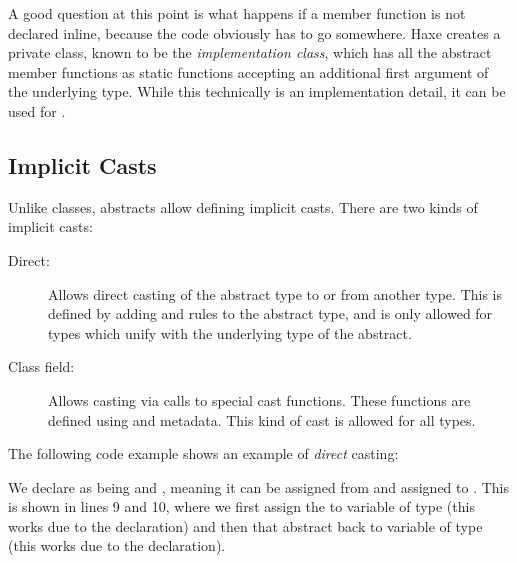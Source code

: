 A good question at this point is what happens if a member function is not declared inline, because the code obviously has to go somewhere. Haxe creates a private class, known to be the \emph{implementation class}, which has all the abstract member functions as static functions accepting an additional first argument  of the underlying type. While this technically is an implementation detail, it can be used for .







\subsection{Implicit Casts}
\label{types-abstract-implicit-casts}

Unlike classes, abstracts allow defining implicit casts. There are two kinds of implicit casts:

\begin{description}
	\item[Direct:] Allows direct casting of the abstract type to or from another type. This is defined by adding  and  rules to the abstract type, and is only allowed for types which unify with the underlying type of the abstract.
	\item[Class field:] Allows casting via calls to special cast functions. These functions are defined using  and  metadata. This kind of cast is allowed for all types.
\end{description}
The following code example shows an example of \emph{direct} casting:

We declare  as being  and , meaning it can be assigned from  and assigned to . This is shown in lines 9 and 10, where we first assign the   to variable  of type  (this works due to the  declaration) and then that abstract back to variable  of type  (this works due to the  declaration).

